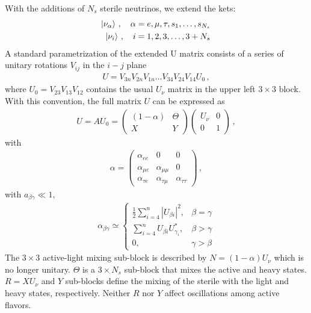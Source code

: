 \documentclass[twocolumn]{article}
\newcommand{\na}{\ensuremath{\nu_\alpha}}
\renewcommand{\a}{\ensuremath{\alpha}}
\begin{document}
With the additions of $N_s$ sterile neutrinos, we extend the kets:
\begin{align*}
  \ket{\na}\,, \quad \a &= e,\mu,\tau,s_1,\ldots ,s_{N_s} \\
  \ket{\nu_i}\,, \quad i &= 1,2,3, \ldots, 3+N_s
\,\end{align*}
A standard parametrization of the extended U matrix consists of a series of unitary rotations $V_{ij}$ in the $i-j$ plane
\begin{align*}
  U = V_{3n}V_{2n}V_{1n} \ldots V_{34}V_{24}V_{14}U_{0}
\,,\end{align*}
where $U_0 = V_{23}V_{13}V_{12}$ contains the usual $U_\nu$ matrix in the upper left $3 \times 3$ block.
With this convention, the full matrix $U$ can be expressed as 
\begin{align*}
  U = AU_0 = \begin{pmatrix} 
              (1-\a) & \Theta \\ 
                   X & Y 
            \end{pmatrix}
            \begin{pmatrix} 
              U_\nu & 0 \\
                  0 & 1
            \end{pmatrix} 
\,,\end{align*}
with
\begin{align*}
  \a = \begin{pmatrix} 
        \a_{ee} & 0 & 0 \\
        \a_{\mu e} & \a_{\mu \mu} & 0 \\
        \a_{\tau e} & \a_{\tau \mu} & \a_{\tau \tau}
       \end{pmatrix}
\,,\end{align*}
with $a_{\beta \gamma} \ll 1$,
\begin{align}
  \label{abg}
  \alpha_{\beta \gamma} \simeq\left\{
    \begin{array}{ll}
      \frac{1}{2} \sum_{i=4}^{n}\left|U_{\beta i}\right|^{2}, & \beta=\gamma \\
      \sum_{i=4}^{n} U_{\beta i} U_{\gamma_{i}}^{*}, & \beta>\gamma \\
      0, & \gamma>\beta
    \end{array}\right.
\end{align}
The $3 \times 3$ active-light mixing sub-block is described by $N=(1-\a)U_\nu$ which is no longer unitary. $\Theta$ is a $3 \times N_s$ sub-block that mixes the active and heavy states. $R = X U_\nu$ and $Y$ sub-blocks define the mixing of the sterile with the light and heavy states, respectively. Neither $R$ nor $Y$ affect oscillations among active flavors.
\end{document}
